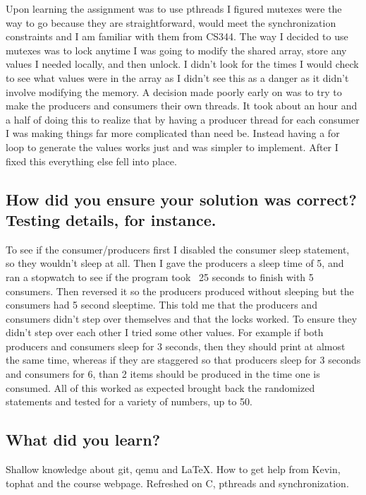 \documentclass[letterpaper,10pt,titlepage]{article}
\begin{document}
 \sloppy Upon learning the assignment was to use pthreads I figured mutexes were the way to go because they are straightforward, would meet the synchronization constraints and I am familiar with them from CS344. The way I decided to use mutexes was to lock anytime I was going to modify the shared array, store any values I needed locally, and then unlock. I didn’t look for the times I would check to see what values were in the array as I didn’t see this as a danger as it didn’t involve modifying the memory. A decision made poorly early on was to try to make the producers and consumers their own threads. It took about an hour and a half of doing this to realize that by having a producer thread for each consumer I was making things far more complicated than need be. Instead having a for loop to generate the values works just and was simpler to implement. After I fixed this everything else fell into place.

\subsection{How did you ensure your solution was correct? Testing details, for instance.}

 \sloppy To see if the consumer/producers first I disabled the consumer sleep statement, so they wouldn’t sleep at all. Then I gave the producers a sleep time of 5, and ran a stopwatch to see if the program took ~25 seconds to finish with 5 consumers. Then reversed it so the producers produced without sleeping but the consumers had 5 second sleeptime. This told me that the producers and consumers didn’t step over themselves and that the locks worked. To ensure they didn’t step over each other I tried some other values. For example if both producers and consumers sleep for 3 seconds, then they should print at almost the same time, whereas if they are staggered so that producers sleep for 3 seconds and consumers for 6, than 2 items should be produced in the time one is consumed. All of this worked as expected brought back the randomized statements and tested for a variety of numbers, up to 50.

\subsection{What did you learn?}

Shallow knowledge about git, qemu and LaTeX. How to get help from Kevin, tophat and the course webpage. Refreshed on C, pthreads and synchronization. 
\end{document}
